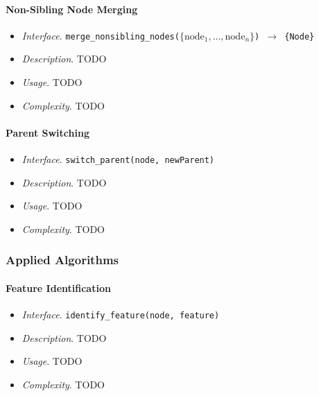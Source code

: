 \paragraph{Non-Sibling Node Merging}

\begin{itemize}

\item \emph{Interface}. \texttt{merge_nonsibling_nodes($\{\mbox{node}_1,\ldots,\mbox{node}_n\}$) $\rightarrow$ \{Node\}}

\item \emph{Description}. TODO

\item \emph{Usage}. TODO

\item \emph{Complexity}. TODO

\end{itemize}

\paragraph{Parent Switching}

\begin{itemize}

\item \emph{Interface}. \texttt{switch_parent(node, newParent)}

\item \emph{Description}. TODO

\item \emph{Usage}. TODO

\item \emph{Complexity}. TODO

\end{itemize}

\subsubsection{Applied Algorithms}

\paragraph{Feature Identification}

\begin{itemize}

\item \emph{Interface}. \texttt{identify_feature(node, feature)}

\item \emph{Description}. TODO

\item \emph{Usage}. TODO

\item \emph{Complexity}. TODO

\end{itemize}

